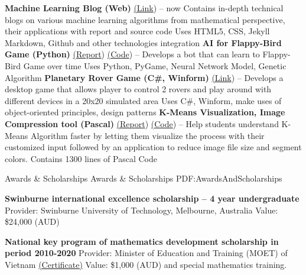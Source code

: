 \documentclass[letterpaper,MMMyyyy,nonstopmode]{simpleresumecv}
\begin{document}
\begin{Body}
\BulletItem
\textbf{Machine Learning Blog (Web)} \href{https://dunglai.github.io}{(\color{blue}Link})
\hfill
{} --
now
\SubBulletItem Contains in-depth technical blogs on various machine learning algorithms from mathematical perspective, their applications with report and source code
\SubBulletItem Uses HTML5, CSS, Jekyll Markdown, Github and other technologies integration
\Gap\Gap\Gap
\BulletItem
\textbf{AI for Flappy-Bird Game (Python)} \href{https://dunglai.github.io/public/post_img/FlappyBirdAI/report.pdf}{(\color{blue}Report}) \href{https://github.com/DungLai/AI-FlappyBird}{(\color{blue}Code})
\hfill
{} --
\SubBulletItem Develops a bot that can learn to Flappy-Bird Game over time
\SubBulletItem Uses Python, PyGame, Neural Network Model, Genetic Algorithm
\Gap\Gap\Gap
\BulletItem
\textbf{Planetary Rover Game (C\#, Winform)} \href{https://dunglai.github.io/2017/05/27/Planetary-Rover/}{(\color{blue}Link})
\hfill
{} --
\SubBulletItem Develops a desktop game that allows player to control 2 rovers and play around with different devices in a 20x20 simulated area
\SubBulletItem Uses C\#, Winform, make uses of object-oriented principles, design patterns
\Gap\Gap\Gap
\BulletItem
\textbf{K-Means Visualization, Image Compression tool (Pascal)} \href{https://dunglai.github.io/public/post_img/Kmeans/Report.pdf}{(\color{blue}Report}) \href{https://github.com/DungLai/Image-Compression-Segmentation}{(\color{blue}Code})
\hfill
{} --
\SubBulletItem Help students understand K-Means Algorithm faster by letting them visualize the process with their customized input followed by an application to reduce image file size and segment colors.
\SubBulletItem Contains 1300 lines of Pascal Code



\Section
{Awards \&\newline
Scholarships}
{Awards \& Scholarships}
{PDF:AwardsAndScholarships}

\BulletItem
\textbf{Swinburne international excellence scholarship – 4 year undergraduate}
\hfill
{}
\SubBulletItem Provider: Swinburne University of Technology, Melbourne, Australia
\SubBulletItem Value: \$24,000 (AUD)

\Gap\Gap\Gap
\BulletItem
\textbf{National key program of mathematics development scholarship in period 2010-2020}
\hfill
{}
\SubBulletItem Provider: Minister of Education and Training (MOET) of Vietnam \href{}{(\color{blue}Certificate)}
\SubBulletItem Value: \$1,000 (AUD) and special mathematics training.



\end{Body}
\end{document}
